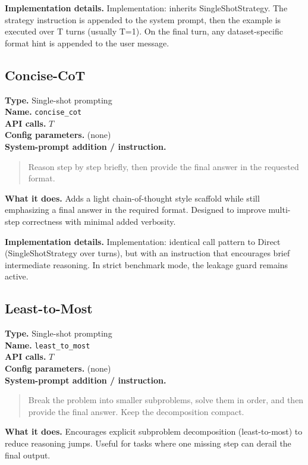 \documentclass[10pt,twocolumn]{article}
\begin{document}
\noindent\textbf{Implementation details.} Implementation: inherits SingleShotStrategy. The strategy instruction is appended to the system prompt, then the example is executed over T turns (usually T=1). On the final turn, any dataset-specific format hint is appended to the user message.

\subsection*{Concise-CoT}
\noindent\textbf{Type.} Single-shot prompting\\
\textbf{Name.} \texttt{concise\_\hspace{0pt}cot}\\
\textbf{API calls.} $T$\\
\textbf{Config parameters.} (none)\\

\noindent\textbf{System-prompt addition / instruction.}
\begin{quote}\footnotesize
Reason step by step briefly, then provide the final answer in the requested format.
\end{quote}
\noindent\textbf{What it does.} Adds a light chain-of-thought style scaffold while still emphasizing a final answer in the required format. Designed to improve multi-step correctness with minimal added verbosity.

\noindent\textbf{Implementation details.} Implementation: identical call pattern to Direct (SingleShotStrategy over turns), but with an instruction that encourages brief intermediate reasoning. In strict benchmark mode, the leakage guard remains active.

\subsection*{Least-to-Most}
\noindent\textbf{Type.} Single-shot prompting\\
\textbf{Name.} \texttt{least\_\hspace{0pt}to\_\hspace{0pt}most}\\
\textbf{API calls.} $T$\\
\textbf{Config parameters.} (none)\\

\noindent\textbf{System-prompt addition / instruction.}
\begin{quote}\footnotesize
Break the problem into smaller subproblems, solve them in order, and then provide the final answer. Keep the decomposition compact.
\end{quote}
\noindent\textbf{What it does.} Encourages explicit subproblem decomposition (least-to-most) to reduce reasoning jumps. Useful for tasks where one missing step can derail the final output.
\end{document}
